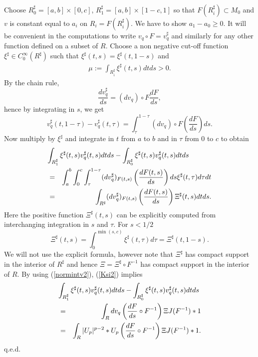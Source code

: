 \documentclass{ip-journal}
\theoremstyle{definition}
\newenvironment{transmeasure}
 {{\sc Proof of Theorem~\ref{transmeasure}.}}
{{\sc q.e.d.} \\}
\numberwithin{equation}{section}
\begin{document}
\begin{transmeasure}
Choose $R_0^\sharp = [a,b] \times [0,c]$, $R_1^\sharp=[a,b]  \times [1-c,1]$ so that $F(R_i^\sharp) \subset M_0$ and $v$ is constant equal to $a_i$ on $R_i=F(R_i^\sharp)$. We have to show $a_1-a_0 \geq 0$. It will be convenient in the computations to write  $ v_q\circ F= v^\sharp_q$ and similarly for any other function defined on a subset of $R$. Choose a non negative cut-off function $\xi^\sharp \in C^\infty_0(R^\sharp)$ such that $\xi^\sharp (t,s) = \xi^\sharp (t, 1-s)$ and
\begin{eqnarray}\label{Ksi1}
\mu:=\int_{R_i^\sharp}\xi^\sharp(t,s)dtds > 0.
\end{eqnarray}
By the chain rule, 
\[
\frac{dv^\sharp_q}{ds}  = (d v_q)\circ F \frac{dF}{ds},
\]
hence by integrating in  $s$, we get
\[
 v_q^\sharp(t,1-\tau) -  v_q^\sharp(t,\tau) = \int_\tau^{1 - \tau} (dv_q)\circ F \left( \frac{dF}{ds} \right)ds.
\]
Now multiply by $\xi^\sharp$ and integrate in $t$ from $a$ to $b$ and in $\tau$ from 0 to $c$ to obtain
\begin{eqnarray}\label{Ksi2}
\lefteqn {\int_{R_1^\sharp} \xi^\sharp(t,s)v^\sharp_q(t,s) dtds - \int_{R_0^\sharp} \xi^\sharp(t,s)v^\sharp_q(t,s)   dtds} \nonumber \\
&=&\int_a^b\int_0^c\int_\tau^{1 - \tau} (dv^\sharp_q)_{F(t,s)}\left(\frac{dF(t,s)}{ds}\right)ds\xi^\sharp(t,\tau)d\tau dt\\
&=&\int_{R^\sharp} (dv^\sharp_q)_{F(t,s)}\left(\frac{dF(t,s)}{ds}\right) \Xi^\sharp(t,s) dt ds. \nonumber
\end{eqnarray}
Here the positive function $\Xi^\sharp (t,s)$ can be explicitly computed from interchanging integration in $s$ and $\tau$. For $s < 1/2$
\[ 
\Xi^\sharp(t,s) = \int_0^{\min(s,c)} \xi^\sharp(t,\tau) d\tau= \Xi^\sharp(t,1-s).
\]
We will not use the explicit formula, however note that $\Xi^\sharp$ has compact support in the interior of $R^\sharp$ and hence $\Xi= \Xi^\sharp \circ F^{-1}$ has compact support in the interior of $R$.
By using  (\ref{normintv2}), (\ref{Ksi2}) implies
\begin{eqnarray*}
\lefteqn {\int_{R_1^\sharp} \xi^\sharp(t,s)v^\sharp_q(t,s) dtds - \int_{R_0^\sharp} \xi^\sharp(t,s)v^\sharp_q(t,s)   dtds}\\
&=&\int_{R} dv_q\left(\frac{dF}{ds} \circ F^{-1} \right)  \Xi  J(F^{-1})*1\\
&= &  \int_{R} |U_p|^{p-2} *U_p \left(\frac{dF}{ds}\circ F^{-1} \right)\Xi  J(F^{-1})*1.

\end{eqnarray*}
\end{transmeasure}
\end{document}
